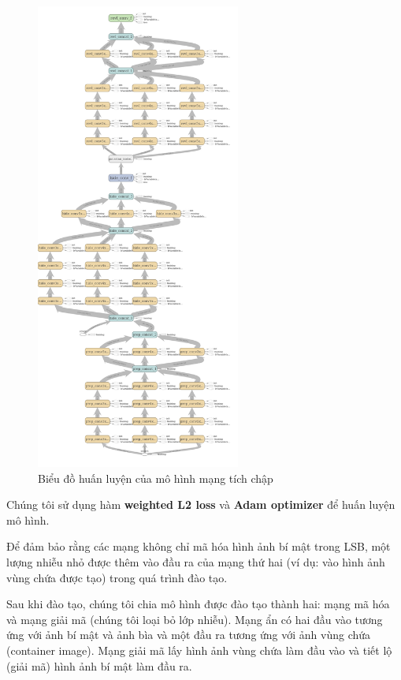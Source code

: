 \begin{figure}[!h]
    \centering
    \includegraphics[width=0.6\textwidth]{graphics/chapter-3/train_graph.png}
    \caption{Biểu đồ huấn luyện của mô hình mạng tích chập}
    \label{fig:train_graph}
\end{figure}


Chúng tôi sử dụng hàm \textbf{weighted L2 loss} và \textbf{Adam optimizer} để huấn luyện mô hình.

Để đảm bảo rằng các mạng không chỉ mã hóa hình ảnh bí mật trong LSB, một lượng nhiễu nhỏ được thêm vào đầu ra của mạng thứ hai (ví dụ: vào hình ảnh vùng chứa được tạo) trong quá trình đào tạo.

Sau khi đào tạo, chúng tôi chia mô hình được đào tạo thành hai: mạng mã hóa và mạng giải mã (chúng tôi loại bỏ lớp nhiễu). Mạng ẩn có hai đầu vào tương ứng với ảnh bí mật và ảnh bìa và một đầu ra tương ứng với ảnh vùng chứa (container image). Mạng giải mã lấy hình ảnh vùng chứa làm đầu vào và tiết lộ (giải mã) hình ảnh bí mật làm đầu ra.

